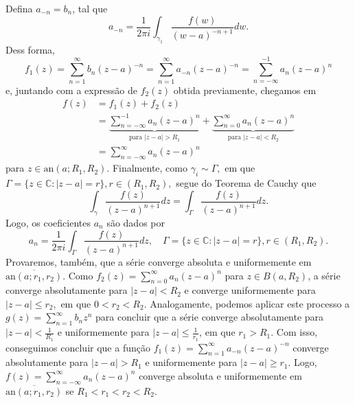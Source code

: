 \documentclass[complex.tex]{subfiles}
\begin{document}
\begin{proof*}
	Defina \(a_{-n}=b_{n}\), tal que
	\[
		a_{-n} = \frac{1}{2\pi i}\int_{\gamma _{1}}^{}\frac{f(w)}{(w-a)^{-n+1}}dw.
	\]
	Dess forma,
	\[
		f_{1}(z) = \sum\limits_{n=1}^{\infty}b_{n}(z-a)^{-n}=\sum\limits_{n=1}^{\infty}a_{-n}(z-a)^{-n}=\sum\limits_{n=-\infty}^{-1}a_{n}(z-a)^{n}
	\]
	e, juntando com a expressão de \(f_{2}(z)\) obtida previamente, chegamos em
	\begin{align*}
		f(z) & = f_{1}(z) + f_{2}(z)                                                                                                                                                   \\
		     & = \underbrace{\sum\limits_{n=-\infty}^{-1}a_{n}(z-a)^{n}}_{\text{para }|z-a|>R_{1}} + \underbrace{\sum\limits_{n=0}^{\infty}a_{n}(z-a)^{n}}_{\text{para }|z-a| < R_{2}} \\
		     & = \sum\limits_{n=-\infty}^{\infty}a_{n}(z-a)^{n}
	\end{align*}
	para \(z\in \mathrm{an}(a; R_{1}, R_{2}).\) Finalmente, como \(\gamma_{i}\sim\Gamma ,\) em que \(\Gamma =\{z\in \mathbb{C}:|z-a| = r\}, r\in (R_{1}, R_{2}),\) segue
	do Teorema de Cauchy que
	\[
		\int_{\gamma }^{}\frac{f(z)}{(z-a)^{n+1}}dz = \int_{\Gamma }^{}\frac{f(z)}{(z-a)^{n+1}}dz.
	\]
	Logo, os coeficientes \(a_{n}\) são dados por
	\[
		a_{n} = \frac{1}{2\pi i}\int_{\Gamma }^{}\frac{f(z)}{(z-a)^{n+1}}dz,\quad \Gamma = \{z\in \mathbb{C}:|z-a|=r\},r\in(R_{1},R_{2}).
	\]
	Provaremos, também, que a série converge absoluta e uniformemente em \(\overline{\mathrm{an}(a; r_{1}, r_{2})}\). Como \(f_2(z) = \sum\limits_{n=0}^{\infty}a_{n}(z-a)^{n}\) para \(z\in B(a, R_{2})\),
	a série converge absolutamente para \(|z-a| < R_{2}\) e converge uniformemente para \(|z-a|\leq r_{2},\) em que \(0 < r_{2} < R_{2}.\)
	Analogamente, podemos aplicar este processo a \(g(z) = \sum\limits_{n=1}^{\infty}b_{n}z^{n}\) para concluir que a série converge absolutamente para
	\(|z-a| < \frac{1}{R_{1}}\) e uniformemente para \(|z-a|\leq \frac{1}{r_{1}}\), em que \(r_{1} > R_{1}.\) Com isso, conseguimos concluir que a função
	\(f_{1}(z) = \sum\limits_{n=1}^{\infty}a_{-n}(z-a)^{-n}\) converge absolutamente para \(|z-a| > R_{1}\) e uniformemente para \(|z-a| \geq r_{1}.\) Logo,
	\(f(z) = \sum\limits_{n=-\infty}^{\infty}a_{n}(z-a)^{n}\) converge absoluta e uniformemente em \(\overline{\mathrm{an}(a; r_{1}, r_{2})}\) se \(R_{1} < r_{1} < r_{2} < R_{2}.\)


\end{proof*}
\end{document}
